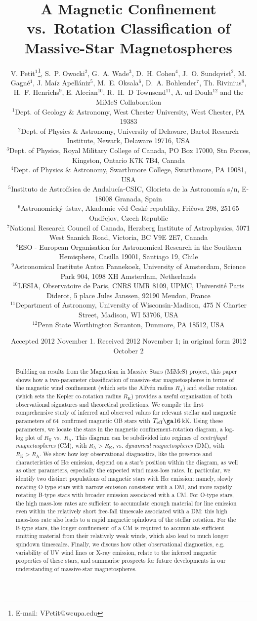 \documentclass[useAMS,usenatbib]{mn2e}
\title[Classification of Massive Star Magnetospheres]{A Magnetic Confinement vs.\ Rotation Classification of Massive-Star Magnetospheres
}
\author[Petit et al.]{%
V. Petit$^{1}$\thanks{E-mail: VPetit@wcupa.edu}, 
S.~P. Owocki$^{2}$,
G.~A. Wade$^{3}$,
D.~H. Cohen$^{4}$,
J.~O. Sundqvist$^{2}$,
\newauthor
M. Gagn\'e$^{1}$,
J. Ma\'iz Apell\'aniz$^{5}$,
M.~E. Oksala$^{6}$,
D.~A. Bohlender$^{7}$,
Th. Rivinius$^{8}$,
\newauthor
H.~F. Henrichs$^{9}$,
E. Alecian$^{10}$,
R.~H.~D Townsend$^{11}$,
A. ud-Doula$^{12}$
\newauthor
and the MiMeS Collaboration
\\
$^{1}$Dept. of Geology \& Astronomy, West Chester University, West Chester, PA 19383\\
$^{2}$Dept. of Physics \& Astronomy, University of Delaware, Bartol Research Institute, Newark, Delaware 19716, USA\\
$^{3}$Dept. of Physics, Royal Military College of Canada, PO Box 17000, Stn Forces, Kingston, Ontario K7K 7B4, Canada\\
$^{4}$Dept. of Physics \& Astronomy, Swarthmore College, Swarthmore, PA 19081, USA\\
$^{5}$Instituto de Astrof\'isica de Andaluc\'ia-CSIC, Glorieta de la Astronom\'ia s/n, E-18008 Granada, Spain\\
$^{6}$Astronomick\'y \'ustav, Akademie v\v{e}d \v{C}esk\'e republiky, Fri\v{c}ova 298, 251\,65 Ond\v{r}ejov, Czech Republic\\
$^{7}$National Research Council of Canada, Herzberg Institute of Astrophysics, 5071 West Saanich Road, Victoria, BC V9E 2E7, Canada\\
$^{8}$ESO - European Organisation for Astronomical Research in the Southern Hemisphere, Casilla 19001, Santiago 19, Chile\\
$^{9}$Astronomical Institute Anton Pannekoek, University of Amsterdam, Science Park 904, 1098 XH Amsterdam, Netherlands\\
$^{10}$LESIA, Observatoire de Paris, CNRS UMR 8109, UPMC, Universit\'e Paris Diderot, 5 place Jules Janssen, 92190 Meudon, France\\
$^{11}$Department of Astronomy, University of Wisconsin-Madison, 475 N Charter Street, Madison, WI 53706, USA\\
$^{12}$Penn State Worthington Scranton, Dunmore, PA 18512, USA
}
\newcommand{\nstars}{64}
\newcommand{\ra}{R_\mathrm{A}}
\newcommand{\rk}{R_\mathrm{K}}
\newcommand{\teff}{T_\mathrm{eff}}
\begin{document}


\date{Accepted 2012 November 1.  Received 2012 November 1; in original form 2012 October 2 }

\pagerange{\pageref{firstpage}--\pageref{lastpage}} 

\maketitle

\label{firstpage}

\begin{abstract}


Building on results from the Magnetism in Massive Stars (MiMeS) project, this paper shows how a two-parameter classification of massive-star magnetospheres in terms of the magnetic wind confinement (which sets the Alfv\'{e}n radius $\ra$) and stellar rotation (which sets the Kepler co-rotation radius $\rk$) provides a useful organisation of both observational signatures and theoretical predictions. 
We compile the first comprehensive study of inferred and observed values for relevant stellar and magnetic parameters of \nstars\ confirmed magnetic OB stars with $\teff \ga 16$\,kK.
Using these parameters, we locate the stars in the magnetic confinement-rotation diagram, a log-log plot of $\rk$ vs.\ $\ra$. 
This diagram can be subdivided into regimes of {\em centrifugal magnetospheres} (CM), with $\ra > \rk$, vs. {\em dynamical magnetospheres} (DM), with $\rk > \ra$.
We show how key observational diagnostics, like the presence and characteristics of H$\alpha$ emission, depend on a star's position within the diagram, as well as other parameters, especially the expected wind mass-loss rates.
In particular, we identify two distinct populations of magnetic stars with H$\alpha$ emission: namely, slowly rotating O-type stars with narrow emission consistent with a DM, and more rapidly rotating B-type stars with broader emission associated with a CM.
For O-type stars, the high mass-loss rates are sufficient to accumulate enough material for line emission even within the relatively short free-fall timescale associated with a DM: this high mass-loss rate also leads to a rapid magnetic spindown of the stellar rotation. For the B-type stars, the longer confinement of a CM is required to accumulate sufficient emitting material from their relatively weak winds, which also lead to much longer spindown timescales.
Finally, we discuss how other observational diagnostics, e.g. variability of UV wind lines or X-ray emission, relate to the inferred magnetic properties of these stars, and summarise prospects for future developments in our understanding of massive-star magnetospheres. 





\end{abstract}
\end{document}
